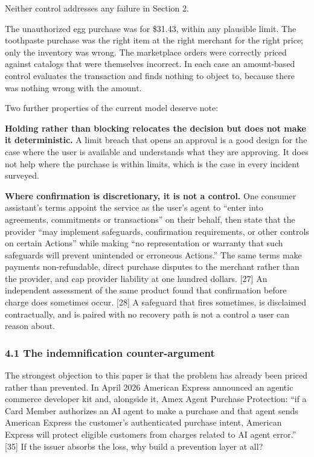 \documentclass[
  11pt,
  letterpaper,
]{article}
\begin{document}
Neither control addresses any failure in Section 2.

The unauthorized egg purchase was for \$31.43, within any plausible
limit. The toothpaste purchase was the right item at the right merchant
for the right price; only the inventory was wrong. The marketplace
orders were correctly priced against catalogs that were themselves
incorrect. In each case an amount-based control evaluates the
transaction and finds nothing to object to, because there was nothing
wrong with the amount.

Two further properties of the current model deserve note:

\textbf{Holding rather than blocking relocates the decision but does not
make it deterministic.} A limit breach that opens an approval is a good
design for the case where the user is available and understands what
they are approving. It does not help where the purchase is within
limits, which is the case in every incident surveyed.

\textbf{Where confirmation is discretionary, it is not a control.} One
consumer assistant's terms appoint the service as the user's agent to
``enter into agreements, commitments or transactions'' on their behalf,
then state that the provider ``may implement safeguards, confirmation
requirements, or other controls on certain Actions'' while making ``no
representation or warranty that such safeguards will prevent unintended
or erroneous Actions.'' The same terms make payments non-refundable,
direct purchase disputes to the merchant rather than the provider, and
cap provider liability at one hundred dollars. {[}27{]} An independent
assessment of the same product found that confirmation before charge
does sometimes occur. {[}28{]} A safeguard that fires sometimes, is
disclaimed contractually, and is paired with no recovery path is not a
control a user can reason about.

\subsubsection{4.1 The indemnification
counter-argument}\label{the-indemnification-counter-argument}

The strongest objection to this paper is that the problem has already
been priced rather than prevented. In April 2026 American Express
announced an agentic commerce developer kit and, alongside it, Amex
Agent Purchase Protection: ``if a Card Member authorizes an AI agent to
make a purchase and that agent sends American Express the customer's
authenticated purchase intent, American Express will protect eligible
customers from charges related to AI agent error.'' {[}35{]} If the
issuer absorbs the loss, why build a prevention layer at all?
\end{document}
